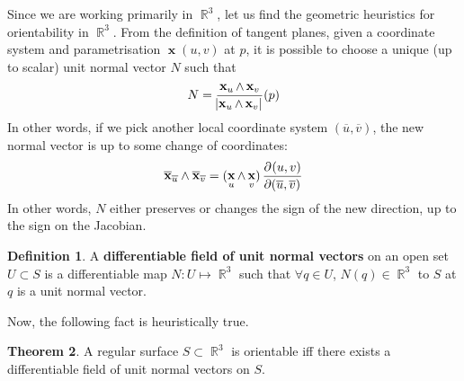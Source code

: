 \documentclass{amsart} %
\theoremstyle{mytheoremstyle}
\theoremstyle{definition}
\newtheorem{definition}{Definition}[section]
\newtheorem{theorem}[definition]{Theorem}
\numberwithin{equation}{section}
\DeclareMathOperator{\R}{\mathbb{R}}
\DeclareMathOperator{\1}{\mathbbm{1}}
\DeclareMathOperator{\x}{\mathbf{x}}
\begin{document}
Since we are working primarily in $\R^3$, let us find the geometric heuristics for orientability in $\R^3$. From the definition of tangent planes, given a coordinate system and parametrisation $\x(u,v)$ at $p$, it is possible to choose a unique (up to scalar) unit normal vector $N$ such that
\begin{align*}
N = \frac{\x_u \wedge \x_v}{\abs{\x_u \wedge \x_v}} (p)
\end{align*}
In other words, if we pick another local coordinate system $(\overline{u},\overline{v})$, the new normal vector is up to some change of coordinates:
\begin{align*}
\overline{\x}_{\overline{u}} \wedge \overline{\x}_{\overline{v}} = (\x_u \wedge \x_v) \dpd{(u,v)}{(\overline{u},\overline{v})}
\end{align*}
In other words, $N$ either preserves or changes the sign of the new direction, up to the sign on the Jacobian.

\begin{definition}
	\label{defdifferentiablefieldofunitnormalvectors}
	A \textbf{differentiable field of unit normal vectors} on an open set $ U \subset S$ is a differentiable map $N : U \mapsto \R^3$ such that $\forall q \in U$, $N(q) \in \R^3$ to $S$ at $q$ is a unit normal vector.
\end{definition}


Now, the following fact is heuristically true.

\begin{theorem}
	\label{thmregularorientablesurfaceiffdifffieldunitnormalexists}
	A regular surface $S \subset \R^3$ is orientable iff there exists a differentiable field of unit normal vectors on $S$.
\end{theorem}
\end{document}
